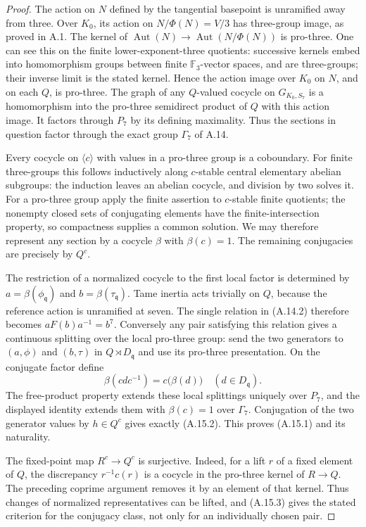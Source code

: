 \begin{proof}
The action on $N$ defined by the tangential basepoint is
unramified away from three. Over $K_0$, its action on
$N/\Phi(N)=V/3$ has three-group image, as proved in A.1.
The kernel of
$\operatorname{Aut}(N)\to\operatorname{Aut}(N/\Phi(N))$
is pro-three. One can see this on the finite lower-exponent-three
quotients: successive kernels embed into homomorphism groups
between finite $\mathbb F_3$-vector spaces, and are three-groups;
their inverse limit is the stated kernel. Hence the action image
over $K_0$ on $N$, and on each $Q$, is pro-three. The graph of
any $Q$-valued cocycle on $G_{K_0,S_7}$ is a homomorphism into
the pro-three semidirect product of $Q$ with this action image.
It factors through $P_7$ by its defining maximality. Thus the
sections in question factor through the exact group $\Gamma_7$
of A.14.

Every cocycle on $\langle c\rangle$ with values in a pro-three
group is a coboundary. For finite three-groups this follows
inductively along $c$-stable central elementary abelian subgroups:
the induction leaves an abelian cocycle, and division by two
solves it. For a pro-three group apply the finite assertion to
$c$-stable finite quotients; the nonempty closed sets of
conjugating elements have the finite-intersection property, so
compactness supplies a common solution. We may therefore
represent any section by a cocycle $\beta$ with $\beta(c)=1$.
The remaining conjugacies are precisely by $Q^c$.

The restriction of a normalized cocycle to the first local
factor is determined by
$a=\beta(\phi_{\mathfrak q})$ and
$b=\beta(\tau_{\mathfrak q})$. Tame inertia acts trivially
on $Q$, because the reference action is unramified at seven.
The single relation in (A.14.2) therefore becomes
$aF(b)a^{-1}=b^7$. Conversely any pair satisfying this relation
gives a continuous splitting over the local pro-three group:
send the two generators to $(a,\phi)$ and $(b,\tau)$ in
$Q\rtimes D_{\mathfrak q}$ and use its pro-three presentation.
On the conjugate factor define
\[
 \beta(cdc^{-1})=c\bigl(\beta(d)\bigr)
       \quad(d\in D_{\mathfrak q}).
\]
The free-product property extends these local splittings
uniquely over $P_7$, and the displayed identity extends them
with $\beta(c)=1$ over $\Gamma_7$. Conjugation of the two
generator values by $h\in Q^c$ gives exactly (A.15.2).
This proves (A.15.1) and its naturality.

The fixed-point map $R^c\to Q^c$ is surjective. Indeed, for a
lift $r$ of a fixed element of $Q$, the discrepancy
$r^{-1}c(r)$ is a cocycle in the pro-three kernel of $R\to Q$.
The preceding coprime argument removes it by an element of that
kernel. Thus changes of normalized representatives can be
lifted, and (A.15.3) gives the stated criterion for the
conjugacy class, not only for an individually chosen pair.


\end{proof}
